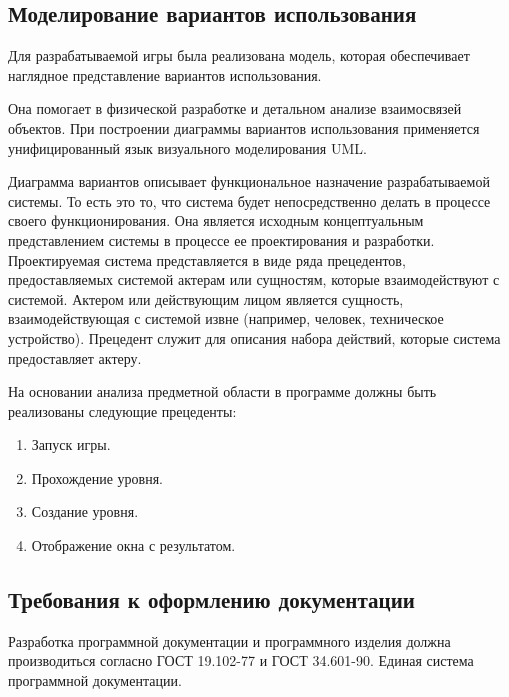 \subsection{Моделирование вариантов использования}

Для разрабатываемой игры была реализована модель, которая обеспечивает наглядное представление вариантов использования.

Она помогает в физической разработке и детальном анализе взаимосвязей объектов. При построении диаграммы вариантов использования применяется унифицированный язык визуального моделирования UML.

Диаграмма вариантов описывает функциональное назначение разрабатываемой системы. То есть это то, что система будет непосредственно делать в процессе своего функционирования. Она является исходным концептуальным представлением системы в процессе ее проектирования и разработки. Проектируемая система представляется в виде ряда прецедентов, предоставляемых системой актерам или сущностям, которые взаимодействуют с системой. Актером или действующим лицом является сущность, взаимодействующая с системой извне (например, человек, техническое устройство). Прецедент служит для описания набора действий, которые система предоставляет актеру.

На основании анализа предметной области в программе должны быть реализованы следующие прецеденты:
\begin{enumerate}
\item Запуск игры.
\item Прохождение уровня.
\item Создание уровня.
\item Отображение окна с результатом.
\end{enumerate}

\subsection{Требования к оформлению документации}

Разработка программной документации и программного изделия должна производиться согласно ГОСТ 19.102-77 и ГОСТ 34.601-90. Единая система программной документации.
